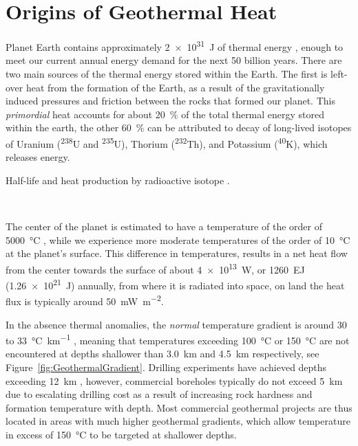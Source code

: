 \section{Origins of Geothermal Heat}
\label{sec:origins_geothermal_energy}

    Planet Earth contains approximately \qty{2e31}{\joule} of thermal energy \cite{Armstead1978}, enough to meet our current annual energy demand for the next 50 billion years. There are two main sources of the thermal energy stored within the Earth. The first is left-over heat from the formation of the Earth, as a result of the gravitationally induced pressures and friction between the rocks that formed our planet. This \emph{primordial} heat accounts for about \qty{20}{\percent} of the total thermal energy stored within the earth, the other \qty{60}{\percent} \cite{Gupta2007} can be attributed to decay of long-lived isotopes of Uranium (\textsuperscript{238}U and \textsuperscript{235}U), Thorium (\textsuperscript{232}Th), and Potassium (\textsuperscript{40}K), which releases energy.

    \begin{table}[H]
        \caption{Half-life and heat production by radioactive isotope \cite{Gupta2007}.}
        \centering 
        \label{table:RadioactiveIsotopes}
        
        \\[10pt]
    \end{table}

    The center of the planet is estimated to have a temperature of the order of \qty{5000}{\degreeCelsius} \cite{Morgan1990}, while we experience more moderate temperatures of the order of \qty{10}{\degreeCelsius} at the planet's surface. This difference in temperatures, results in a net heat flow from the center towards the surface of about \qty{4e13}{\watt}, or \qty{1260}{\exa\joule} (\qty{1.26e21}{\joule}) annually, from where it is radiated into space, on land the heat flux is typically around \qty{50}{\milli\watt\per\square\meter}.

    In the absence thermal anomalies, the \emph{normal} temperature gradient is around \num{30} to \qty{33}{\degreeCelsius\per\km} \cite{DiPippo2016}, meaning that temperatures exceeding \qty{100}{\degreeCelsius} or \qty{150}{\degreeCelsius} are not encountered at depths shallower than \qty{3.0}{\km} and \qty{4.5}{\km} respectively, see Figure~\ref{fig:GeothermalGradient}. Drilling experiments have achieved depths exceeding \qty{12}{km} \cite{Mottaghy2005}, however, commercial boreholes typically do not exceed \qty{5}{\km} due to escalating drilling cost as a result of increasing rock hardness and formation temperature with depth. Most commercial geothermal projects are thus located in areas with much higher geothermal gradients, which allow temperature in excess of \qty{150}{\degreeCelsius} to be targeted at shallower depths.

